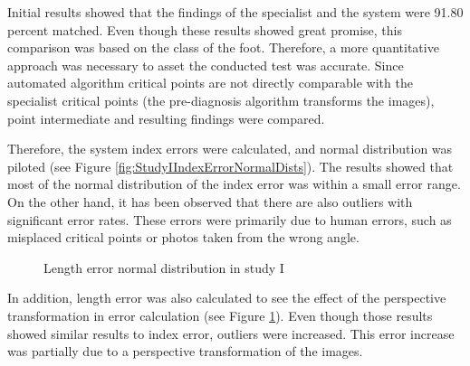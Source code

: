 Initial results showed that the findings of the specialist and the system were 91.80 percent matched. Even though these results showed great promise, this comparison was based on the class of the foot. Therefore, a more quantitative approach was necessary to asset the conducted test was accurate. Since automated algorithm critical points are not directly comparable with the specialist critical points (the pre-diagnosis algorithm transforms the images), point intermediate and resulting findings were compared.

Therefore, the system index errors were calculated, and normal distribution was piloted (see Figure \ref{fig:StudyIIndexErrorNormalDists}). The results showed that most of the normal distribution of the index error was within a small error range. On the other hand, it has been observed that there are also outliers with significant error rates. These errors were primarily due to human errors, such as misplaced critical points or photos taken from the wrong angle. 

\begin{figure}[htbp]
\centering
{}
\caption{Length error normal distribution in study I}
\label{fig:StudyILenghtErrorNormalDists}
\end{figure}

In addition, length error was also calculated to see the effect of the perspective transformation in error calculation (see Figure \ref{fig:StudyILenghtErrorNormalDists}). Even though those results showed similar results to index error, outliers were increased. This error increase was partially due to a perspective transformation of the images.
